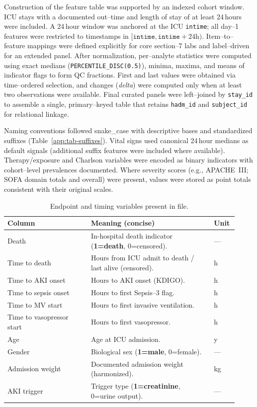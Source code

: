 \medskip
\noindent Construction of the feature table was supported by an indexed cohort window. ICU stays with a documented out--time and length of stay of at least 24\,hours were included. A 24\,hour window was anchored at the ICU \texttt{intime}; all day–1 features were restricted to timestamps in $[\texttt{intime},\texttt{intime}+24\text{h})$. Item–to–feature mappings were defined explicitly for core section–7 labs and label–driven for an extended panel. After normalization, per–analyte statistics were computed using exact medians (\texttt{PERCENTILE\_DISC(0.5)}), minima, maxima, and means of indicator flags to form QC fractions. First and last values were obtained via time–ordered selection, and changes (\textit{delta}) were computed only when at least two observations were available. Final curated panels were left–joined by \texttt{stay\_id} to assemble a single, primary–keyed table that retains \texttt{hadm\_id} and \texttt{subject\_id} for relational linkage.

\medskip
\noindent Naming conventions followed snake\_case with descriptive bases and standardized suffixes (Table~\ref{app:tab-suffixes}). Vital signs used canonical 24\,hour medians as default signals (additional suffix features were included where available). Therapy/exposure and Charlson variables were encoded as binary indicators with cohort–level prevalences documented. Where severity scores (e.g., APACHE~III; SOFA domain totals and overall) were present, values were stored as point totals consistent with their original scales.

\vspace{0.75\baselineskip}
\begin{table}[t]\centering
{\small\renewcommand{\arraystretch}{1.12}\setlength{\tabcolsep}{6pt}%
\caption{Endpoint and timing variables present in file.}
\label{app:tab-endpoint-times}
\begin{tabular}{P{0.34\linewidth} P{0.50\linewidth} P{0.08\linewidth}}
\toprule
\textbf{Column} & \textbf{Meaning (concise)} & \textbf{Unit}\\
\midrule
Death & In-hospital death indicator (\textbf{1=death}, 0=censored). & ---\\
Time to death & Hours from ICU admit to death / last alive (censored). & h\\
Time to AKI onset & Hours to AKI onset (KDIGO). & h\\
Time to sepsis onset & Hours to first Sepsis--3 flag. & h\\
Time to MV start & Hours to first invasive ventilation. & h\\
Time to vasopressor start & Hours to first vasopressor. & h\\
Age & Age at ICU admission. & y\\
Gender & Biological sex (\textbf{1=male}, 0=female). & ---\\
Admission weight & Documented admission weight (harmonized). & kg\\
AKI trigger & Trigger type (\textbf{1=creatinine}, 0=urine output). & ---\\
\bottomrule
\end{tabular}}
\end{table}

